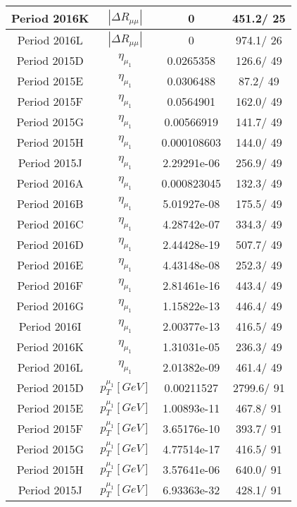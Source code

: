\documentclass{article}
\begin{document}
\begin{longtable}{c|c|c|c}
\hline
 Period 2016K & $|\Delta R_{\mu \mu}|$ & 0 & 451.2/ 25\\
\hline
 Period 2016L & $|\Delta R_{\mu \mu}|$ & 0 & 974.1/ 26\\
\hline
 Period 2015D & $\eta_{\mu_{1}}$ & 0.0265358 & 126.6/ 49\\
\hline
 Period 2015E & $\eta_{\mu_{1}}$ & 0.0306488 &  87.2/ 49\\
\hline
 Period 2015F & $\eta_{\mu_{1}}$ & 0.0564901 & 162.0/ 49\\
\hline
 Period 2015G & $\eta_{\mu_{1}}$ & 0.00566919 & 141.7/ 49\\
\hline
 Period 2015H & $\eta_{\mu_{1}}$ & 0.000108603 & 144.0/ 49\\
\hline
 Period 2015J & $\eta_{\mu_{1}}$ & 2.29291e-06 & 256.9/ 49\\
\hline
 Period 2016A & $\eta_{\mu_{1}}$ & 0.000823045 & 132.3/ 49\\
\hline
 Period 2016B & $\eta_{\mu_{1}}$ & 5.01927e-08 & 175.5/ 49\\
\hline
 Period 2016C & $\eta_{\mu_{1}}$ & 4.28742e-07 & 334.3/ 49\\
\hline
 Period 2016D & $\eta_{\mu_{1}}$ & 2.44428e-19 & 507.7/ 49\\
\hline
 Period 2016E & $\eta_{\mu_{1}}$ & 4.43148e-08 & 252.3/ 49\\
\hline
 Period 2016F & $\eta_{\mu_{1}}$ & 2.81461e-16 & 443.4/ 49\\
\hline
 Period 2016G & $\eta_{\mu_{1}}$ & 1.15822e-13 & 446.4/ 49\\
\hline
 Period 2016I & $\eta_{\mu_{1}}$ & 2.00377e-13 & 416.5/ 49\\
\hline
 Period 2016K & $\eta_{\mu_{1}}$ & 1.31031e-05 & 236.3/ 49\\
\hline
 Period 2016L & $\eta_{\mu_{1}}$ & 2.01382e-09 & 461.4/ 49\\
\hline
 Period 2015D & $p_{T}^{\mu_{1}} [GeV]$ & 0.00211527 & 2799.6/ 91\\
\hline
 Period 2015E & $p_{T}^{\mu_{1}} [GeV]$ & 1.00893e-11 & 467.8/ 91\\
\hline
 Period 2015F & $p_{T}^{\mu_{1}} [GeV]$ & 3.65176e-10 & 393.7/ 91\\
\hline
 Period 2015G & $p_{T}^{\mu_{1}} [GeV]$ & 4.77514e-17 & 416.5/ 91\\
\hline
 Period 2015H & $p_{T}^{\mu_{1}} [GeV]$ & 3.57641e-06 & 640.0/ 91\\
\hline
 Period 2015J & $p_{T}^{\mu_{1}} [GeV]$ & 6.93363e-32 & 428.1/ 91\\

\end{longtable}
\end{document}
